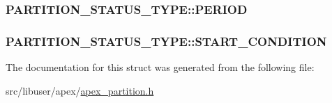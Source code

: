 \subsubsection[{\texorpdfstring{P\+E\+R\+I\+OD}{PERIOD}}]{ P\+A\+R\+T\+I\+T\+I\+O\+N\+\_\+\+S\+T\+A\+T\+U\+S\+\_\+\+T\+Y\+P\+E\+::\+P\+E\+R\+I\+OD}\hypertarget{structPARTITION__STATUS__TYPE_af7b3d2efeee84266bb2272989468a77b}{}\label{structPARTITION__STATUS__TYPE_af7b3d2efeee84266bb2272989468a77b}
\subsubsection[{\texorpdfstring{S\+T\+A\+R\+T\+\_\+\+C\+O\+N\+D\+I\+T\+I\+ON}{START_CONDITION}}]{ P\+A\+R\+T\+I\+T\+I\+O\+N\+\_\+\+S\+T\+A\+T\+U\+S\+\_\+\+T\+Y\+P\+E\+::\+S\+T\+A\+R\+T\+\_\+\+C\+O\+N\+D\+I\+T\+I\+ON}\hypertarget{structPARTITION__STATUS__TYPE_ac235ddfbaadeeffbe6a65f0f2fea69a6}{}\label{structPARTITION__STATUS__TYPE_ac235ddfbaadeeffbe6a65f0f2fea69a6}


The documentation for this struct was generated from the following file\+:\begin{DoxyCompactItemize}
\item 
src/libuser/apex/\hyperlink{apex__partition_8h}{apex\+\_\+partition.\+h}\end{DoxyCompactItemize}
